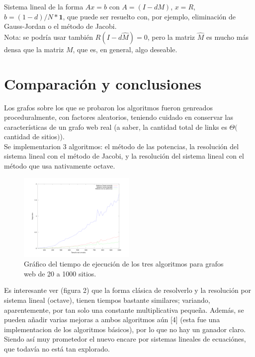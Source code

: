 \documentclass[%
    final,
    notitlepage,
    narroweqnarray,
    inline,
    twoside,
    invited
    ]{ieee}
\begin{document}
Sistema lineal de la forma $Ax = b$ con $A = (I - dM)$, $x = R$, $b = (1-d)/N* \mathbf 1$, que puede ser resuelto con, por ejemplo,
 eliminación de Gauss-Jordan o el método de Jacobi.\\

Nota: se podría usar también $R(I-d\widehat{M}) = 0$, pero la matriz $\widehat{M}$ es mucho más densa que la matriz $M$, que es, en
 general, algo deseable.

\section{Comparación y conclusiones}

Los grafos sobre los que se probaron los algoritmos fueron genreados proceduralmente, con factores aleatorios,
teniendo cuidado en conservar las características de un grafo web real (a saber, la cantidad total de links es
$\Theta($cantidad de sitios$)$).\\

Se implementarion 3 algoritmos: el método de las potencias, la resolución del sistema lineal con el método de Jacobi, y la resolución
 del sistema lineal con el método que usa nativamente octave.

\begin{figure}[h!]
    \centering
    \includegraphics[width=0.5\textwidth]{octave_jacobi_pm.png} %
    \caption {Gráfico del tiempo de ejecución de los tres algoritmos para grafos web de 20 a 1000 sitios.}
\end{figure}

Es interesante ver (figura 2) que la forma clásica de resolverlo y la resolución por sistema lineal (octave), tienen tiempos bastante similares;
 variando, aparentemente, por tan solo una constante multiplicativa pequeña.
Además, se pueden añadir varias mejoras a ambos algoritmos aún [4] (esta fue una implementacion de los algoritmos básicos), por lo que
 no hay un ganador claro.
Siendo así muy prometedor el nuevo encare por sistemas lineales de ecuaciónes, que todavía no está tan explorado.
\end{document}
